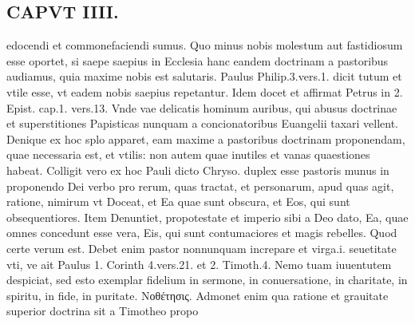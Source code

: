 \documentclass{article}
\begin{document}
\begin{pages}
\section*{CAPVT  IIII. }
\marginpar{[ p.227 ]}\pstart edocendi et commonefaciendi sumus. Quo minus nobis molestum aut fastidiosum esse oportet, si saepe saepius in Ecclesia hanc eandem doctrinam a pastoribus audiamus, quia maxime nobis est salutaris. Paulus Philip.3.vers.1. dicit tutum et vtile esse, vt eadem nobis saepius repetantur. Idem docet et affirmat Petrus in 2. Epist. cap.1. vers.13. Vnde vae delicatis hominum auribus, qui abusus doctrinae et superstitiones Papisticas nunquam a concionatoribus Euangelii taxari vellent.  \pend\pstart Denique ex hoc splo apparet, eam maxime a pastoribus doctrinam proponendam, quae necessaria est, et vtilis: non autem quae inutiles et vanas quaestiones habeat.  \pend\pstart Colligit vero ex hoc Pauli dicto Chryso. duplex esse pastoris munus in proponendo Dei verbo pro rerum, quas tractat, et personarum, apud quas agit, ratione, nimirum vt Doceat, et Ea quae sunt obscura, et Eos, qui sunt obsequentiores. Item Denuntiet, propotestate et imperio sibi a Deo dato, Ea, quae omnes concedunt esse vera, Eis, qui sunt contumaciores et magis rebelles. Quod certe verum est. Debet enim pastor nonnunquam increpare et virga.i. seuetitate vti, ve ait Paulus 1. Corinth 4.vers.21. et 2. Timoth.4.  \pend{} Nemo tuam iuuentutem despiciat, sed esto exemplar fidelium in sermone, in conuersatione, in charitate, in spiritu, in fide, in puritate.  \pend\pstart Νοθέτησις. Admonet enim qua ratione et grauitate superior doctrina sit a Timotheo propo\pend

\end{pages}
\end{document}

